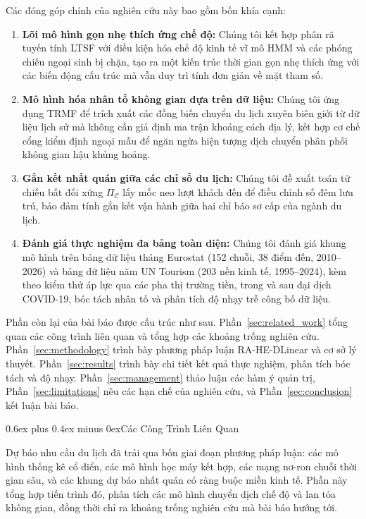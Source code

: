 \documentclass[10pt,journal,compsoc]{IEEEtran}
\makeatletter
\def\section{\@startsection{section}{1}{\z@}{-2.2ex plus -0.8ex minus -0.4ex}%
{0.6ex plus 0.4ex minus 0ex}{\normalfont\sublargesize\rmfamily\bfseries}}
\makeatother
\begin{document}
Các đóng góp chính của nghiên cứu này bao gồm bốn khía cạnh:
\begin{enumerate}
    \item \textbf{Lõi mô hình gọn nhẹ thích ứng chế độ:} Chúng tôi kết hợp phân rã tuyến tính LTSF với điều kiện hóa chế độ kinh tế vĩ mô HMM và các phóng chiếu ngoại sinh bị chặn, tạo ra một kiến trúc thời gian gọn nhẹ thích ứng với các biến động cấu trúc mà vẫn duy trì tính đơn giản về mặt tham số.
    \item \textbf{Mô hình hóa nhân tố không gian dựa trên dữ liệu:} Chúng tôi ứng dụng TRMF để trích xuất các đồng biến chuyển du lịch xuyên biên giới từ dữ liệu lịch sử mà không cần giả định ma trận khoảng cách địa lý, kết hợp cơ chế cổng kiểm định ngoại mẫu để ngăn ngừa hiện tượng dịch chuyển phân phối không gian hậu khủng hoảng.
    \item \textbf{Gắn kết nhất quán giữa các chỉ số du lịch:} Chúng tôi đề xuất toán tử chiếu bất đối xứng $\Pi_{\mathcal{C}}$ lấy mốc neo lượt khách đến để điều chỉnh số đêm lưu trú, bảo đảm tính gắn kết vận hành giữa hai chỉ báo sơ cấp của ngành du lịch.
    \item \textbf{Đánh giá thực nghiệm đa bảng toàn diện:} Chúng tôi đánh giá khung mô hình trên bảng dữ liệu tháng Eurostat (152 chuỗi, 38 điểm đến, 2010--2026) và bảng dữ liệu năm UN Tourism (203 nền kinh tế, 1995--2024), kèm theo kiểm thử áp lực qua các pha thị trường tiền, trong và sau đại dịch COVID-19, bóc tách nhân tố và phân tích độ nhạy trễ công bố dữ liệu.
\end{enumerate}

Phần còn lại của bài báo được cấu trúc như sau. Phần~\ref{sec:related_work} tổng quan các công trình liên quan và tổng hợp các khoảng trống nghiên cứu. Phần~\ref{sec:methodology} trình bày phương pháp luận RA-HE-DLinear và cơ sở lý thuyết. Phần~\ref{sec:results} trình bày chi tiết kết quả thực nghiệm, phân tích bóc tách và độ nhạy. Phần~\ref{sec:management} thảo luận các hàm ý quản trị, Phần~\ref{sec:limitations} nêu các hạn chế của nghiên cứu, và Phần~\ref{sec:conclusion} kết luận bài báo.

\section{\texorpdfstring{Các Công Trình Liên Quan}{Cac Cong Trinh Lien Quan}}
\label{sec:related_work}

Dự báo nhu cầu du lịch đã trải qua bốn giai đoạn phương pháp luận: các mô hình thống kê cổ điển, các mô hình học máy kết hợp, các mạng nơ-ron chuỗi thời gian sâu, và các khung dự báo nhất quán có ràng buộc miền kinh tế. Phần này tổng hợp tiến trình đó, phân tích các mô hình chuyển dịch chế độ và lan tỏa không gian, đồng thời chỉ ra khoảng trống nghiên cứu mà bài báo hướng tới.
\end{document}
